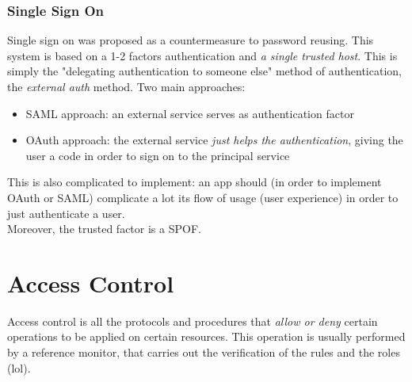 \documentclass{article}
\begin{document}
				\subsubsection{Single Sign On}
					Single sign on was proposed as a countermeasure to password reusing. This system is based on a 1-2 factors authentication and \emph{a single trusted host}. This is simply the "delegating authentication to someone else" method of authentication, the \emph{external auth} method. Two main approaches:
					\begin{itemize}
						\item SAML approach: an external service serves as authentication factor
						\item OAuth approach: the external service \emph{just helps the authentication}, giving the user a code in order to sign on to the principal service
					\end{itemize}
					This is also complicated to implement: an app should (in order to implement OAuth or SAML) complicate a lot its flow of usage (user experience) in order to just authenticate a user.\\
					Moreover, the trusted factor is a SPOF.
					
		\section{Access Control}
			Access control is all the protocols and procedures that \emph{allow or deny} certain operations to be applied on certain resources. This operation is usually performed by a reference monitor, that carries out the verification of the rules and the roles (lol).
			
\end{document}
